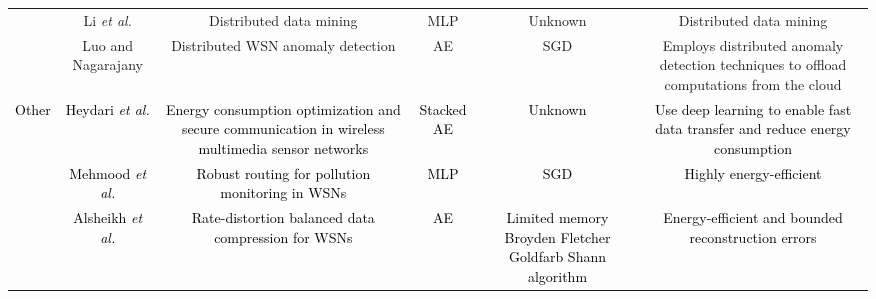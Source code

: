 \documentclass[journal,comsoc,letter]{IEEEtran}
\newcommand{\rev}[1]{\textcolor{black}{#1}}
\begin{document}
\begin{table*}[h!]
\begin{tabular}{|c|C{2CM}|C{3CM}|C{1.5CM}|C{2CM}|C{3.8CM}|}
                                                     & Li \emph{et al.} \cite{li2015distributed}                    & Distributed data mining                                                                                & MLP                                          & Unknown                                                       & Distributed data mining                                                                                                                             \\  
                                                     & Luo and Nagarajany \cite{luo2018distributed}                 & Distributed WSN anomaly detection                                                                      & AE                                           & SGD                                                           & Employs distributed anomaly detection techniques to offload computations from the cloud                                                             \\ \hline
\multirow{4}{*}{\rev{Other}}                              & \rev{Heydari \emph{et al.} \cite{heydari2017reduce}}          & \rev{Energy consumption optimization and secure communication in wireless multimedia sensor networks} & \rev{Stacked AE}                              & \rev{Unknown}                                                  & \rev{Use deep learning to enable fast data transfer and reduce energy consumption}                                                                   \\  
                                                     & \rev{Mehmood \emph{et al.} \cite{mehmood2017eldc}}            & \rev{Robust routing for pollution monitoring in WSNs}                                            & \rev{MLP}                                     & \rev{SGD}                                                      & \rev{Highly energy-efficient}                                                                                                                        \\  
                                                     & \rev{Alsheikh \emph{et al.} \cite{alsheikh2016rate}}          & \rev{Rate-distortion balanced data compression for WSNs}                                                & \rev{AE}                                      & \rev{Limited memory Broyden Fletcher Goldfarb Shann algorithm} & \rev{Energy-efficient and bounded reconstruction errors}                                                                              \\  

\end{tabular}
\end{table*}
\end{document}
